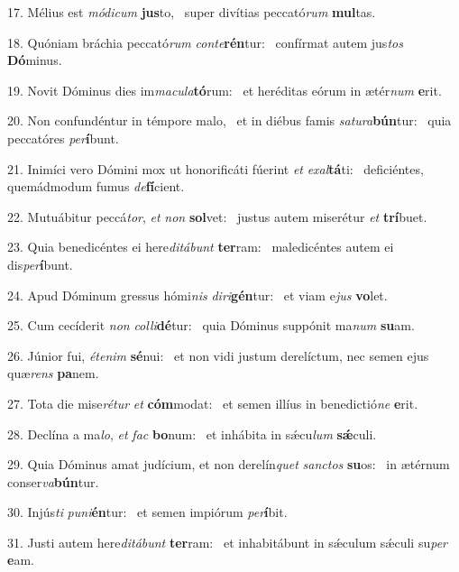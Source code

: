 17. Mélius est \textit{mó}\textit{di}\textit{cum} \textbf{jus}to, \ast\  super divítias peccató\textit{rum} \textbf{mul}tas.\

18. Quóniam bráchia peccató\textit{rum} \textit{con}\textit{te}\textbf{rén}tur: \ast\  confírmat autem jus\textit{tos} \textbf{Dó}minus.\

19. Novit Dóminus dies im\textit{ma}\textit{cu}\textit{la}\textbf{tó}rum: \ast\  et heréditas eórum in ætér\textit{num} \textbf{e}rit.\

20. Non confundéntur in témpore malo, \dag\  et in diébus famis \textit{sa}\textit{tu}\textit{ra}\textbf{bún}tur: \ast\  quia peccatóres \textit{per}\textbf{í}bunt.\

21. Inimíci vero Dómini mox ut honorificáti fúerint \textit{et} \textit{ex}\textit{al}\textbf{tá}ti: \ast\  deficiéntes, quemádmodum fumus \textit{de}\textbf{fí}cient.\

22. Mutuábitur peccá\textit{tor}, \textit{et} \textit{non} \textbf{sol}vet: \ast\  justus autem miserétur \textit{et} \textbf{trí}buet.\

23. Quia benedicéntes ei here\textit{di}\textit{tá}\textit{bunt} \textbf{ter}ram: \ast\  maledicéntes autem ei dis\textit{per}\textbf{í}bunt.\

24. Apud Dóminum gressus hómi\textit{nis} \textit{di}\textit{ri}\textbf{gén}tur: \ast\  et viam e\textit{jus} \textbf{vo}let.\

25. Cum cecíderit \textit{non} \textit{col}\textit{li}\textbf{dé}tur: \ast\  quia Dóminus suppónit ma\textit{num} \textbf{su}am.\

26. Júnior fui, \textit{ét}\textit{e}\textit{nim} \textbf{sé}nui: \ast\  et non vidi justum derelíctum, nec semen ejus quæ\textit{rens} \textbf{pa}nem.\

27. Tota die mise\textit{ré}\textit{tur} \textit{et} \textbf{cóm}modat: \ast\  et semen illíus in benedictió\textit{ne} \textbf{e}rit.\

28. Declína a ma\textit{lo}, \textit{et} \textit{fac} \textbf{bo}num: \ast\  et inhábita in sǽcu\textit{lum} \textbf{sǽ}culi.\

29. Quia Dóminus amat judícium, et non derelín\textit{quet} \textit{sanc}\textit{tos} \textbf{su}os: \ast\  in ætérnum conser\textit{va}\textbf{bún}tur.\

30. Injús\textit{ti} \textit{pu}\textit{ni}\textbf{én}tur: \ast\  et semen impiórum \textit{per}\textbf{í}bit.\

31. Justi autem here\textit{di}\textit{tá}\textit{bunt} \textbf{ter}ram: \ast\  et inhabitábunt in sǽculum sǽculi su\textit{per} \textbf{e}am.\

